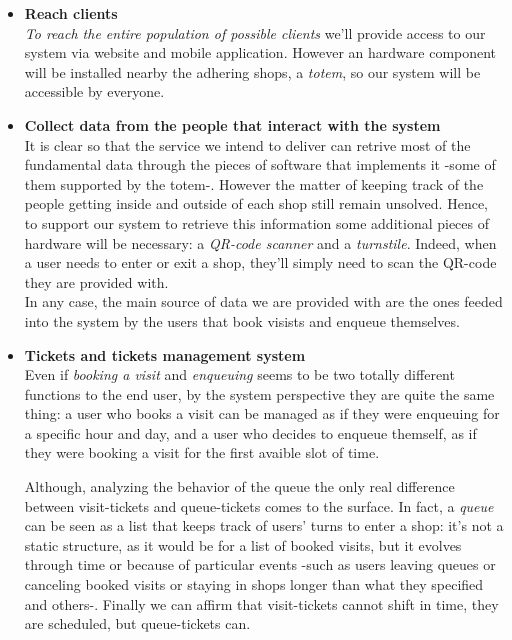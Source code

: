 \begin{itemize}[topsep=0pt]
    \item \textbf{Reach clients}\\
    \textit{To reach the entire population of possible clients} we'll provide access to our system via website and mobile application. However an hardware component will be installed nearby the adhering shops, a \textit{totem}, so our system will be accessible by everyone.\\

    \item \textbf{Collect data from the people that interact with the system}\\
    It is clear so that the service we intend to deliver can retrive most of the fundamental data through the pieces of software that implements it -some of them supported by the totem-. However the matter of keeping track of the people getting inside and outside of each shop still remain unsolved. Hence, to support our system to retrieve this information some additional pieces of hardware will be necessary: a \textit{QR-code scanner} and a \textit{turnstile}. Indeed, when a user needs to enter or exit a shop, they'll simply need to scan the QR-code they are provided with.\\
    In any case, the main source of data we are provided with are the ones feeded into the system by the users that book visists and enqueue themselves.
    
    \item \textbf{Tickets and tickets management system}\\

    Even if \textit{booking a visit} and \textit{enqueuing} seems to be two totally different functions to the end user, by the system perspective they are quite the same thing: a user who books a visit can be managed as if they were enqueuing for a specific hour and day, and a user who decides to enqueue themself, as if they were booking a visit for the first avaible slot of time. 

    Although, analyzing the behavior of the queue the only real difference between visit-tickets and queue-tickets comes to the surface. In fact, a \textit{queue} can be seen as a list that keeps track of users' turns to enter a shop: it's not a static structure, as it would be for a list of booked visits, but it evolves through time or because of particular events -such as users leaving queues or canceling booked visits or staying in shops longer than what they specified and others-. 
    Finally we can affirm that visit-tickets cannot shift in time, they are scheduled, but queue-tickets can.
    

\end{itemize}
